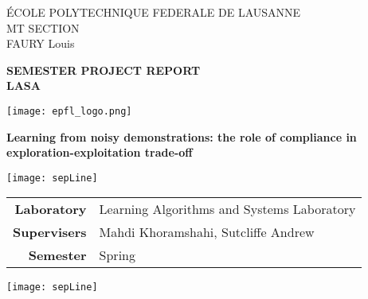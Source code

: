 





\begin{titlepage}
        	{\sffamily
        		\noindent \'ECOLE POLYTECHNIQUE FEDERALE DE LAUSANNE \\
        		MT SECTION\\
        		FAURY Louis \\
        	}
	
	\vfill 
        \begin{center}
   		{\sffamily\Large
         		\textbf{SEMESTER PROJECT REPORT} \\
			\vspace{0.3cm}
			\large
			\textbf{LASA}
		}
		\vspace{0.8cm}
	
        		\texttt{[image: epfl\_logo.png]}
        
        		\vspace{0.5cm}
         
         	\sffamily\huge\textbf{ 	
Learning from noisy demonstrations: the role of compliance in exploration-exploitation trade-off} \\
        \end{center}
        
	\vspace{0.6cm}
         \centering\texttt{[image: sepLine]}
         \vspace{0.2cm}

        \begin{center}
		\begin{tabular}{rl}
    			\textbf{Laboratory} & Learning Algorithms and Systems Laboratory\\
    			\textbf{Supervisers} & Mahdi Khoramshahi, Sutcliffe Andrew\\
			\textbf{Semester} & Spring\\
		\end{tabular}
	\end{center}
	\vspace{0.2cm}
         \centering\texttt{[image: sepLine]}
         \vspace{0.6cm}
         \vfill
\end{titlepage}
